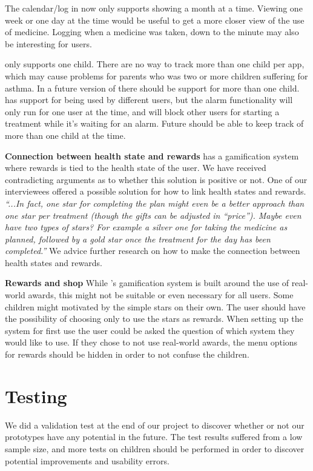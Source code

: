 The calendar/log in \app{} now only supports showing a month at a time. Viewing one week or one day at the time would be useful to get a more closer view of the use of medicine. Logging when a medicine was taken, down to the minute may also be interesting for users. 

\app{} only supports one child. There are no way to track more than one child per app, which may cause problems for parents who was two or more children suffering for asthma. In a future version of \app{} there should be support for more than one child. \ab{} has support for being used by different users, but the alarm functionality will only run for one user at the time, and will block other users for starting a treatment while it's waiting for an alarm. Future \ab{} should be able to keep track of more than one child at the time. 

\textbf{Connection between health state and rewards}
\app{} has a gamification system where rewards is tied to the health state of the user. We have received contradicting arguments as to whether this solution is positive or not. One of our interviewees offered a possible solution for how to link health states and rewards.
\emph{``...In fact, one star for completing the plan might even be a better approach than one star per treatment (though the gifts can be adjusted in ``price''). Maybe even have two types of stars? For example a silver one for taking the medicine as planned, followed by a gold star once the treatment for the day has been completed.''}
We advice further research on how to make the connection between health states and rewards. 

\textbf{Rewards and shop}
While \app{}'s gamification system is built around the use of real-world awards, this might not be suitable or even necessary for all users. Some children might motivated by the simple stars on their own. The user should have the possibility of choosing only to use the stars as rewards. When setting up the system for first use the user could be asked the question of which system they would like to use. If they chose to not use real-world awards, the menu options for rewards should be hidden in order to not confuse the children. 

\section{Testing}
\label{sec:furtherworktesting}

We did a validation test at the end of our project to discover whether or not our prototypes have any potential in the future. The test results suffered from a low sample size, and more tests on children should be performed in order to discover potential improvements and usability errors. 

